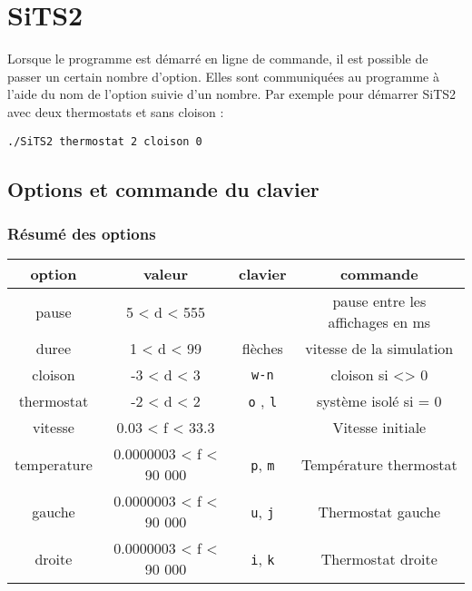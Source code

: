 %
\section{SiTS2}
%
%
Lorsque le programme est démarré en ligne de commande, il est possible de passer un certain nombre d'option. Elles sont communiquées au programme à l'aide du nom de l'option suivie d'un nombre. Par exemple pour démarrer SiTS2 avec deux thermostats et sans cloison :
%
\begin{center}
\texttt{./SiTS2 thermostat 2 cloison 0}
\end{center}
%
\subsection{Options et commande du clavier}
%
\subsubsection{Résumé des options}
\begin{center}
\begin{tabular}{cccc}
option & valeur & clavier & commande \\
\hline
pause & 5 < d < 555 &  & pause entre les affichages en ms \\
duree & 1 < d < 99 & flèches & vitesse de la simulation \\
cloison & -3 < d < 3 & \texttt{w-n} & cloison si <> 0 \\
thermostat & -2 < d < 2 & \texttt{o} , \texttt{l} & système isolé si = 0 \\
vitesse & 0.03 < f < 33.3 &  & Vitesse initiale \\
temperature & 0.0000003 < f < 90 000 & \texttt{p}, \texttt{m} & Température thermostat \\
gauche & 0.0000003 < f < 90 000 & \texttt{u}, \texttt{j} & Thermostat gauche \\
droite & 0.0000003 < f < 90 000 & \texttt{i}, \texttt{k} & Thermostat droite \\
\end{tabular}
\end{center}
%
